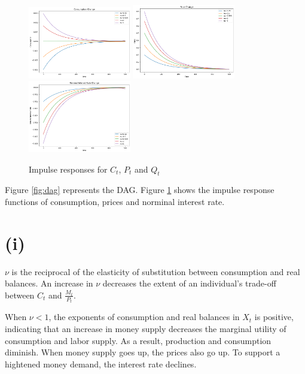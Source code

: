 \documentclass[12pt]{article}
\begin{document}
\begin{figure}[ht]
    \centering
    \includegraphics[width=0.4\textwidth]{figs/irf_c.png}
    \includegraphics[width=0.4\textwidth]{figs/irf_p.png}
    \includegraphics[width=0.4\textwidth]{figs/irf_q.png}
    \caption{Impulse responses for $C_t$, $P_t$ and $Q_t$}
    \label{fig:irf}
\end{figure}

Figure \ref{fig:dag} represents the DAG. 
Figure \ref{fig:irf} shows the impulse response functions of consumption, 
prices and norminal interest rate.

\section*{(i)}

$\nu$ is the reciprocal of the elasticity of substitution between consumption
and real balances. 
An increase in $\nu$ decreases the extent of an individual's trade-off between $C_t$ and $\frac{M_{t}}{P_{t}}$. 

When $\nu < 1$, the exponents of consumption and real balances in $X_{t}$ is positive, 
indicating that an increase in money supply decreases the marginal utility of consumption and labor supply. 
As a result, production and consumption diminish. 
When money supply goes up, the prices also go up. 
To support a hightened money demand, the interest rate declines. 
\end{document}
